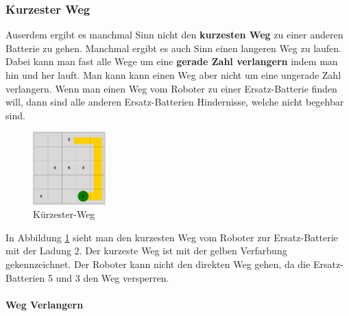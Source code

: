 \documentclass[a4paper,12pt,arial]{scrartcl}
\begin{document}
\subsubsection{Kurzester Weg}
Auserdem ergibt es manchmal Sinn nicht den \textbf{kurzesten Weg} zu einer anderen Batterie zu gehen.
Manchmal ergibt es auch Sinn einen langeren Weg zu laufen. Dabei kann man fast alle Wege um eine \textbf{gerade Zahl verlangern} indem man hin und her lauft. Man kann kann einen Weg aber nicht um eine ungerade Zahl verlangern.
Wenn man einen Weg vom Roboter zu einer Ersatz-Batterie finden will, dann sind alle anderen Ersatz-Batterien Hindernisse, welche nicht begehbar sind.
\captionsetup[figure]{name=Abb.}
\begin{figure}
\vspace{-10pt}
    \includegraphics[width=0.25\textwidth]{shortest_w.pdf}
    \vspace{-25pt}
    \caption{Kürzester-Weg}
    \label{fig:weg}
\vspace{-30pt}
\end{figure}
\captionsetup[figure]{name=Abbildung}
In Abbildung \ref{fig:weg}  sieht man den kurzesten Weg vom Roboter zur Ersatz-Batterie mit der Ladung 2. Der kurzeste Weg ist mit der gelben Verfarbung gekennzeichnet. Der Roboter kann nicht den direkten Weg gehen, da die Ersatz-Batterien 5 und 3 den Weg versperren.

\paragraph{Weg Verlangern}
\end{document}
